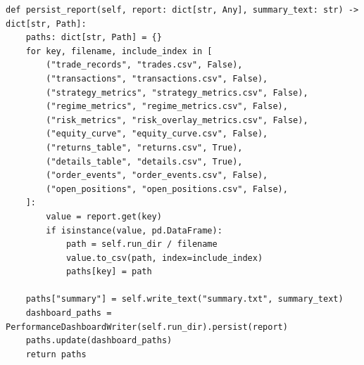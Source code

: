 \begin{code}
\begin{verbatim}
def persist_report(self, report: dict[str, Any], summary_text: str) -> dict[str, Path]:
    paths: dict[str, Path] = {}
    for key, filename, include_index in [
        ("trade_records", "trades.csv", False),
        ("transactions", "transactions.csv", False),
        ("strategy_metrics", "strategy_metrics.csv", False),
        ("regime_metrics", "regime_metrics.csv", False),
        ("risk_metrics", "risk_overlay_metrics.csv", False),
        ("equity_curve", "equity_curve.csv", False),
        ("returns_table", "returns.csv", True),
        ("details_table", "details.csv", True),
        ("order_events", "order_events.csv", False),
        ("open_positions", "open_positions.csv", False),
    ]:
        value = report.get(key)
        if isinstance(value, pd.DataFrame):
            path = self.run_dir / filename
            value.to_csv(path, index=include_index)
            paths[key] = path

    paths["summary"] = self.write_text("summary.txt", summary_text)
    dashboard_paths = PerformanceDashboardWriter(self.run_dir).persist(report)
    paths.update(dashboard_paths)
    return paths
\end{verbatim}
\caption{Persistarea rapoartelor CSV, text și dashboard}
\label{code:anexa_persistare_artefacte}
\end{code}

